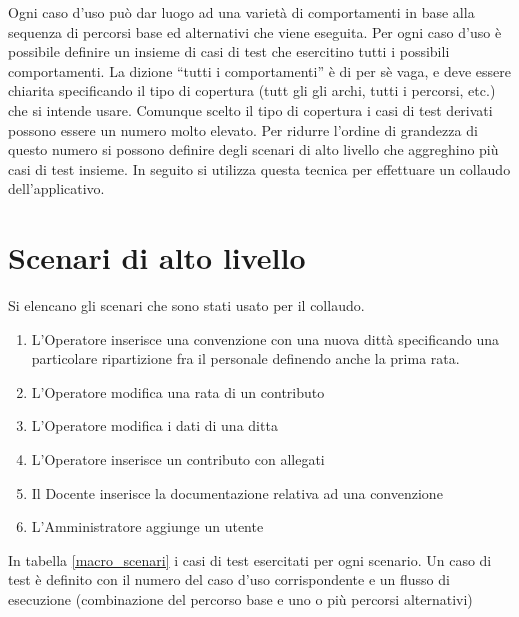 Ogni caso d'uso può dar luogo ad una varietà di comportamenti in base alla sequenza di percorsi base ed alternativi che viene eseguita.
Per ogni caso d'uso è possibile definire un insieme di casi di test che esercitino tutti i possibili comportamenti. La dizione  ``tutti i comportamenti'' è di per sè vaga, e deve essere chiarita specificando il tipo di 
copertura (tutt gli gli archi, tutti i percorsi, etc.) che si intende usare. Comunque scelto il tipo di copertura i casi di test derivati possono essere un numero molto elevato. Per ridurre l'ordine di grandezza di questo numero
si possono definire degli scenari di alto livello che aggreghino più casi di test insieme. In seguito si utilizza questa tecnica per effettuare un collaudo dell'applicativo.

\section{Scenari di alto livello}
Si elencano gli scenari che sono stati usato per il collaudo.

\begin{enumerate}
 \item L'Operatore inserisce una convenzione con una nuova dittà specificando una particolare ripartizione fra il personale definendo anche la prima rata. \label{MS1}
 \item L'Operatore modifica una rata di un contributo \label{MS2}
 \item L'Operatore modifica i dati di una ditta \label{MS3}
 \item L'Operatore inserisce un contributo con allegati \label{MS4}
 \item Il Docente inserisce la documentazione relativa ad una convenzione \label{MS5}
 \item L'Amministratore aggiunge un utente \label{MS6}
\end{enumerate}

In tabella \ref{macro_scenari} i casi di test esercitati per ogni scenario. Un caso di test è definito con il numero del caso d'uso corrispondente e un flusso di esecuzione (combinazione del percorso base e uno o più percorsi alternativi) \\


